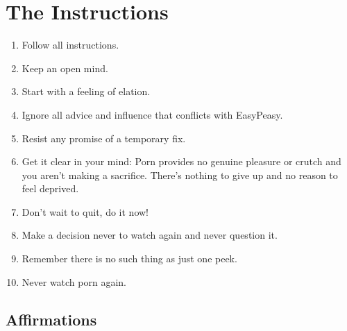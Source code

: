 \documentclass[
]{book}
\begin{document}
\hypertarget{the-instructions}{%
\chapter{The Instructions}\label{the-instructions}}

\begin{enumerate}
\def\labelenumi{\arabic{enumi}.}
\item
  Follow all instructions.
\item
  Keep an open mind.
\item
  Start with a feeling of elation.
\item
  Ignore all advice and influence that conflicts with EasyPeasy.
\item
  Resist any promise of a temporary fix.
\item
  Get it clear in your mind: Porn provides no genuine pleasure or crutch and you aren't making a sacrifice. There's nothing to give up and no reason to feel deprived.
\item
  Don't wait to quit, do it now!
\item
  Make a decision never to watch again and never question it.
\item
  Remember there is no such thing as just one peek.
\item
  Never watch porn again.
\end{enumerate}

\hypertarget{affirmations}{%
\section{Affirmations}\label{affirmations}}
\end{document}
